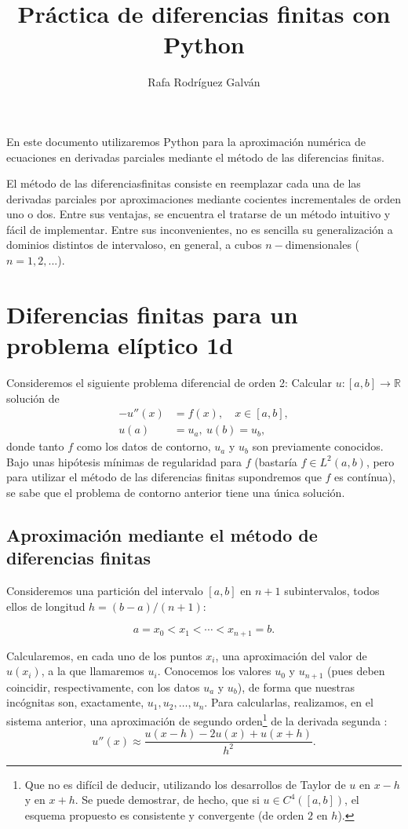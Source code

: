 \documentclass[11pt,spanish,a4wide]{article}
\title{Práctica de diferencias finitas con Python}
\author{Rafa Rodríguez Galván}
\def\Rset{\mathbb{R}}
\begin{document}
\maketitle

  En este documento utilizaremos Python para  la
  aproximación numérica de ecuaciones en derivadas parciales mediante
  el método de las diferencias finitas.

El método de las diferenciasfinitas consiste en reemplazar cada una de
las derivadas parciales por aproximaciones mediante cocientes
incrementales de orden uno o dos. Entre sus ventajas, se encuentra el
tratarse de un método intuitivo y fácil de implementar. Entre sus
inconvenientes, no es sencilla su generalización a dominios distintos
de intervaloso, en general, a cubos $n-$dimensionales ($n=1,2,...$).

\section{Diferencias finitas para un problema elíptico 1d}

\label{sec:MEF-difusion-1d}

Consideremos el siguiente problema diferencial de orden 2:
Calcular $u:[a,b] \to  \Rset$ solución de
\begin{align}
  \label{pb-eliptico-1d-a}
  -u''(x) &= f(x), \quad x\in [a,b], \\
  \label{pb-eliptico-1d-b}
  u(a)&=u_a, \ u(b)=u_b,
\end{align}
donde tanto $f$ como los datos de contorno, $u_a$ y $u_b$ son
previamente conocidos. Bajo unas hipótesis mínimas de regularidad para
$f$ (bastaría $f\in L^2(a,b)$, pero para utilizar el método de las
diferencias finitas supondremos que $f$ es contínua), se sabe que el
problema de contorno anterior tiene una única solución.

\subsection{Aproximación mediante el método de diferencias finitas}
Consideremos una partición del intervalo $[a,b]$ en $n+1$
subintervalos, todos ellos de longitud $h=(b-a)/(n+1)$:

$$
a=x_0 < x_1 < \cdots < x_{n+1} = b.
$$

Calcularemos, en cada uno de los puntos $x_i$, una aproximación del
valor de $u(x_i)$, a la que llamaremos $u_i$. Conocemos los valores $u_0$ y
$u_{n+1}$ (pues deben coincidir, respectivamente, con los datos $u_a$
y $u_b$), de forma que nuestras incógnitas son, exactamente, $u_1,
u_2,\dots,u_n$. Para calcularlas, realizamos, en el sistema anterior,
una aproximación de segundo orden\footnote{Que no es difícil de
  deducir, utilizando los desarrollos de Taylor de $u$ en
$x-h$ y en $x+h$. Se puede demostrar, de hecho, que si $u \in
C^4([a,b])$, el esquema propuesto es  consistente
y convergente (de orden $2$ en $h$).} de la derivada segunda
:
$$
u''(x) \approx \frac{u(x-h)-2u(x)+u(x+h)}{h^2}.
$$
\end{document}
